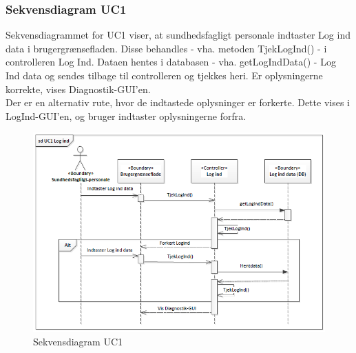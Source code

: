 \subsubsection{Sekvensdiagram UC1}
Sekvensdiagrammet for UC1 viser, at sundhedsfagligt personale indtaster Log ind data i brugergrænsefladen. Disse behandles - vha. metoden TjekLogInd() - i controlleren Log Ind. Dataen hentes i databasen - vha. getLogIndData() - Log Ind data og sendes tilbage til controlleren og tjekkes heri. Er oplysningerne korrekte, vises Diagnostik-GUI'en. \\
Der er en alternativ rute, hvor de indtastede oplysninger er forkerte. Dette vises i LogInd-GUI'en, og bruger indtaster oplysningerne forfra.
\begin{figure}[H]
\centering
\includegraphics[scale=0.70]{sd1}
\caption{Sekvensdiagram UC1}
\end{figure}

